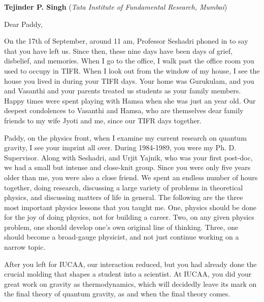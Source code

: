 \documentclass[prd, preprint, longbibliography, 12pt]{revtex4-2}
\begin{document}
\bigskip
\bigskip
\newpage

\centerline{{\bf Tejinder P. Singh} ({\it Tata Institute of Fundamental Research, Mumbai})}
\medskip
{} 

\noindent Dear Paddy,

\noindent On the 17th of September, around 11 am, Professor Seshadri phoned in to say that you have left us. Since then, these nine days have been days of grief, disbelief, and memories. When I go to the office, I walk past the office room you used to occupy in TIFR. When I look out from the window of my house, I see the house you lived in during your TIFR days. Your home was Gurukulam, and you and Vasanthi and your parents treated us students as your family members. Happy times were spent playing with Hamsa when she was just an year old. Our deepest condolences to Vasanthi and Hamsa, who are themselves dear family friends to my wife Jyoti and me, since our TIFR days together.

Paddy, on the physics front, when I examine my current research on quantum gravity, I see your imprint all over. During 1984-1989, you were my Ph. D. Supervisor. Along with Seshadri, and Urjit Yajnik, who was your first post-doc, we had a small but intense and close-knit group. Since you were only five years older than me, you were also a close friend. We spent an endless number of hours together, doing research, discussing a large variety of problems in theoretical physics, and discussing matters of life in general. The following are the three most important physics lessons that you taught me.  One, physics should be done for the joy of doing physics, not for building a career. Two, on any given physics problem, one should develop one’s own original line of thinking. Three, one should become a broad-gauge physicist, and not just continue working on a narrow topic.

After you left for IUCAA, our interaction reduced, but you had already done the crucial molding that shapes a student into a scientist. At IUCAA, you did your great work on gravity as thermodynamics, which will decidedly leave its mark on the final theory of quantum gravity, as and when the final theory comes. 
\end{document}
